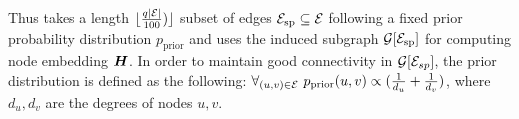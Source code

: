 Thus \sgs takes a length $\lfloor \frac{q|{\mathcal{E}}|}{100}) \rfloor$ subset of edges ${\mathcal{E}}_\mathrm{sp} \subseteq {\mathcal{E}}$ following a fixed prior probability distribution $p_\mathrm{prior}$ and uses the induced subgraph ${\mathcal{G}}[{\mathcal{E}}_\mathrm{sp}]$ for computing node embedding ${\bm{H}}$. In order to maintain good connectivity in ${\mathcal{G}}[{\mathcal{E}}_{sp}]$, the prior distribution is defined as the following:
$\forall_{(u,v) \in {\mathcal{E}}}~p_\mathrm{prior}(u,v) \propto (\frac{1}{d_u} + \frac{1}{d_v})$, where $d_u,d_v$ are the degrees of nodes $u,v$.
% 


